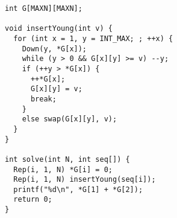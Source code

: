 \begin{lstlisting}
int G[MAXN][MAXN];

void insertYoung(int v) {
  for (int x = 1, y = INT_MAX; ; ++x) {
    Down(y, *G[x]);
    while (y > 0 && G[x][y] >= v) --y;
    if (++y > *G[x]) {
      ++*G[x];
      G[x][y] = v;
      break;
    }
    else swap(G[x][y], v);
  }
}

int solve(int N, int seq[]) {
  Rep(i, 1, N) *G[i] = 0;
  Rep(i, 1, N) insertYoung(seq[i]);
  printf("%d\n", *G[1] + *G[2]);
  return 0;
}

\end{lstlisting}